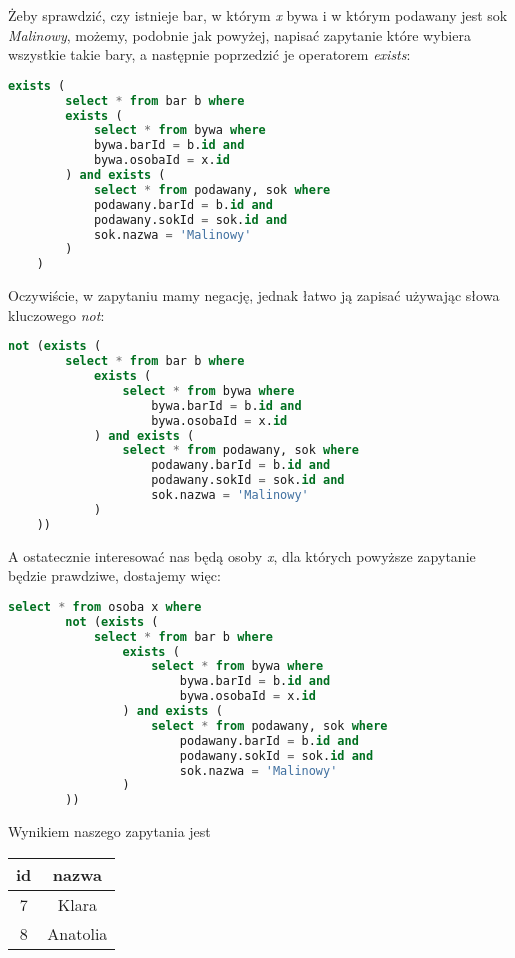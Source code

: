 \begin{example}
    Żeby sprawdzić, czy istnieje bar, w którym \textit{x} bywa i w którym podawany jest sok \textit{Malinowy}, możemy, podobnie jak powyżej, napisać zapytanie które wybiera wszystkie takie bary, a następnie poprzedzić je operatorem \textit{exists}: 
    
    \begin{lstlisting}[language=SQL, breaklines=true]
    exists (
        select * from bar b where 
        exists (
            select * from bywa where 
            bywa.barId = b.id and 
            bywa.osobaId = x.id 
        ) and exists (
            select * from podawany, sok where 
            podawany.barId = b.id and 
            podawany.sokId = sok.id and 
            sok.nazwa = 'Malinowy'
        )
    )
    \end{lstlisting}
    
    Oczywiście, w zapytaniu mamy negację, jednak łatwo ją zapisać używając słowa kluczowego \textit{not}:
    
   \begin{lstlisting}[language=SQL, breaklines=true]
    not (exists (
        select * from bar b where 
            exists (
                select * from bywa where 
                    bywa.barId = b.id and 
                    bywa.osobaId = x.id 
            ) and exists (
                select * from podawany, sok where 
                    podawany.barId = b.id and 
                    podawany.sokId = sok.id and 
                    sok.nazwa = 'Malinowy'
            )
    ))
    \end{lstlisting}
    
    A ostatecznie interesować nas będą osoby \textit{x}, dla których powyższe zapytanie będzie prawdziwe, dostajemy więc:
    \clearpage
    
   \begin{lstlisting}[language=SQL, breaklines=true]
   select * from osoba x where
        not (exists (
            select * from bar b where 
                exists (
                    select * from bywa where 
                        bywa.barId = b.id and 
                        bywa.osobaId = x.id 
                ) and exists (
                    select * from podawany, sok where 
                        podawany.barId = b.id and 
                        podawany.sokId = sok.id and 
                        sok.nazwa = 'Malinowy'
                )
        ))
    \end{lstlisting}
    
    Wynikiem naszego zapytania jest
    \begin{table}[H]
        \centering
        \begin{tabular}[t]{|c|c|}
            \hline
            id & nazwa \\
            \hline
            7 & Klara \\
            8 & Anatolia \\
            \hline
        \end{tabular}
    \end{table}
        

\end{example}
